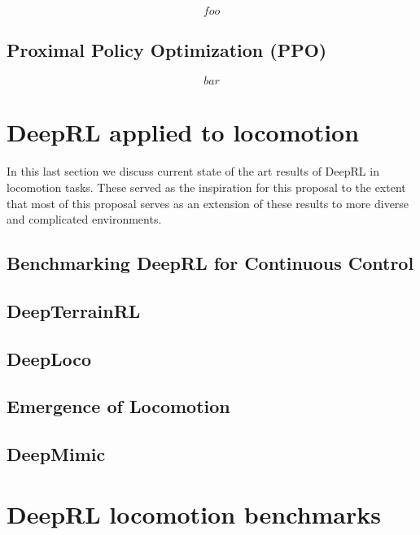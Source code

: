 \cite{TRPO}

\begin{equation}
    foo
\end{equation}

\subsection{Proximal Policy Optimization (PPO)}

\cite{PPO}

\begin{equation}
    bar
\end{equation}

\section{DeepRL applied to locomotion}

In this last section we discuss current state of the art results of DeepRL in
locomotion tasks. These served as the inspiration for this proposal to the extent
that most of this proposal serves as an extension of these results to more 
diverse and complicated environments.


\subsection{Benchmarking DeepRL for Continuous Control}


\subsection{DeepTerrainRL}


\subsection{DeepLoco}


\subsection{Emergence of Locomotion}


\subsection{DeepMimic}



\section{DeepRL locomotion benchmarks}

